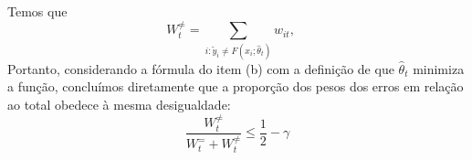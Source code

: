 Temos que
\[
    W_t^{\neq} = \sum_{i: \tilde{y}_i \neq F(x_i; \hat{\theta}_t)} w_{it}, \quad
\]
Portanto, considerando a fórmula do item (b) com a definição de que $\hat{\theta}_t$ minimiza a função, concluímos diretamente que a proporção dos pesos dos erros em relação ao total obedece à mesma desigualdade:
\begin{equation*}
    \frac{W_t^{\neq}}{W_t^{=} + W_t^{\neq}} \le \frac{1}{2} - \gamma
\end{equation*}
